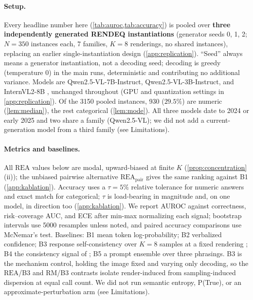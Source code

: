 \documentclass[11pt]{article}
\newcommand{\rea}{\mathrm{REA}}
\newcommand{\rmg}{\mathrm{RM}}
\begin{document}
\paragraph{Setup.}
\label{sec:setup}
Every headline number here (\cref{tab:auroc,tab:accuracy}) is pooled over \textbf{three independently generated RENDEQ instantiations} (generator seeds 0, 1, 2; $N{=}350$ instances each, 7 families, $K{=}8$ renderings, no shared instances), replacing an earlier single-instantiation design (\cref{app:replication}). ``Seed'' always means a generator instantiation, not a decoding seed; decoding is greedy (temperature 0) in the main runs, deterministic and contributing no additional variance. Models are Qwen2.5-VL-7B-Instruct, Qwen2.5-VL-3B-Instruct, and InternVL2-8B \citep{bai2025qwen25vl,chen2024internvl2}, unchanged throughout (GPU and quantization settings in \cref{app:replication}). Of the 3150 pooled instances, 930 ($29.5\%$) are numeric (\cref{lem:median}), the rest categorical (\cref{lem:mode}). All three models date to 2024 or early 2025 and two share a family (Qwen2.5-VL); we did not add a current-generation model from a third family (see Limitations).

\paragraph{Metrics and baselines.} All $\rea$ values below are modal, upward-biased at finite $K$ (\cref{prop:concentration}(ii)); the unbiased pairwise alternative $\rea_{\text{pair}}$ gives the same ranking against B1 (\cref{app:kablation}). Accuracy uses a $\tau{=}5\%$ relative tolerance for numeric answers and exact match for categorical; $\tau$ is load-bearing in magnitude and, on one model, in direction too (\cref{app:kablation}). We report AUROC against correctness, risk--coverage AUC, and ECE after min-max normalizing each signal; bootstrap intervals use 5000 resamples unless noted, and paired accuracy comparisons use McNemar's test. Baselines: B1 mean token log-probability; B2 verbalized confidence; B3 response self-consistency over $K{=}8$ samples at a fixed rendering \citep{wang2023selfconsistency}; B4 the consistency signal of \citet{khan2024consistency}; B5 a prompt ensemble over three phrasings. B3 is the mechanism control, holding the image fixed and varying only decoding, so the $\rea$/B3 and $\rmg$/B3 contrasts isolate render-induced from sampling-induced dispersion at equal call count. We did not run semantic entropy, P(True), or an approximate-perturbation arm (see Limitations).
\end{document}
